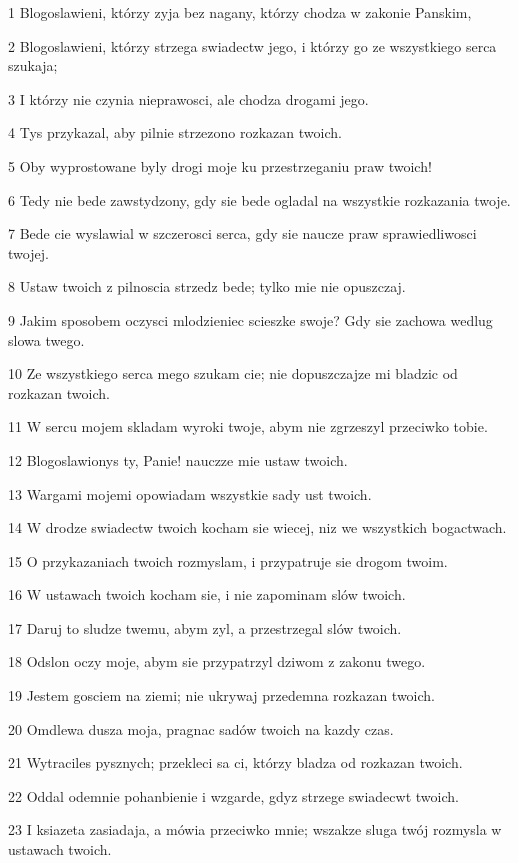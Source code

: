 \par 1 Blogoslawieni, którzy zyja bez nagany, którzy chodza w zakonie Panskim,
\par 2 Blogoslawieni, którzy strzega swiadectw jego, i którzy go ze wszystkiego serca szukaja;
\par 3 I którzy nie czynia nieprawosci, ale chodza drogami jego.
\par 4 Tys przykazal, aby pilnie strzezono rozkazan twoich.
\par 5 Oby wyprostowane byly drogi moje ku przestrzeganiu praw twoich!
\par 6 Tedy nie bede zawstydzony, gdy sie bede ogladal na wszystkie rozkazania twoje.
\par 7 Bede cie wyslawial w szczerosci serca, gdy sie naucze praw sprawiedliwosci twojej.
\par 8 Ustaw twoich z pilnoscia strzedz bede; tylko mie nie opuszczaj.
\par 9 Jakim sposobem oczysci mlodzieniec scieszke swoje? Gdy sie zachowa wedlug slowa twego.
\par 10 Ze wszystkiego serca mego szukam cie; nie dopuszczajze mi bladzic od rozkazan twoich.
\par 11 W sercu mojem skladam wyroki twoje, abym nie zgrzeszyl przeciwko tobie.
\par 12 Blogoslawionys ty, Panie! nauczze mie ustaw twoich.
\par 13 Wargami mojemi opowiadam wszystkie sady ust twoich.
\par 14 W drodze swiadectw twoich kocham sie wiecej, niz we wszystkich bogactwach.
\par 15 O przykazaniach twoich rozmyslam, i przypatruje sie drogom twoim.
\par 16 W ustawach twoich kocham sie, i nie zapominam slów twoich.
\par 17 Daruj to sludze twemu, abym zyl, a przestrzegal slów twoich.
\par 18 Odslon oczy moje, abym sie przypatrzyl dziwom z zakonu twego.
\par 19 Jestem gosciem na ziemi; nie ukrywaj przedemna rozkazan twoich.
\par 20 Omdlewa dusza moja, pragnac sadów twoich na kazdy czas.
\par 21 Wytraciles pysznych; przekleci sa ci, którzy bladza od rozkazan twoich.
\par 22 Oddal odemnie pohanbienie i wzgarde, gdyz strzege swiadecwt twoich.
\par 23 I ksiazeta zasiadaja, a mówia przeciwko mnie; wszakze sluga twój rozmysla w ustawach twoich.
